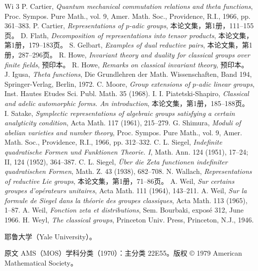 \begin{thebibliography}{Wi 3}
 P. Cartier, \emph{Quantum mechanical commutation relations and theta functions}, Proc. Sympos. Pure Math., vol. 9, Amer. Math. Soc., Providence, R.I., 1966, pp. 361--383.
 P. Cartier, \emph{Representations of $p$-adic groups}, 本论文集，第1册，111--155页。
 D. Flath, \emph{Decomposition of representations into tensor products}, 本论文集，第1册，179--183页。
 S. Gelbart, \emph{Examples of dual reductive pairs}, 本论文集，第1册，287--296页。
 R. Howe, \emph{Invariant theory and duality for classical groups over finite fields}, 预印本。
 R. Howe, \emph{Remarks on classical invariant theory}, 预印本。
 J. Igusa, \emph{Theta functions}, Die Grundlehren der Math. Wissenschaften, Band 194, Springer-Verlag, Berlin, 1972.
 C. Moore, \emph{Group extensions of $p$-adic linear groups}, Inst. Hautes Etudes Sci. Publ. Math. 35 (1968).
 I. I. Piatetski-Shapiro, \emph{Classical and adelic automorphic forms. An introduction}, 本论文集，第1册，185--188页。
 I. Satake, \emph{Symplectic representations of algebraic groups satisfying a certain analyticity condition}, Acta Math. 117 (1961), 215--279.
 G. Shimura, \emph{Moduli of abelian varieties and number theory}, Proc. Sympos. Pure Math., vol. 9, Amer. Math. Soc., Providence, R.I., 1966, pp. 312--332.
 C. L. Siegel, \emph{Indefinite quadratische Formen und Funktionen Theorie. I}, Math. Ann. 124 (1951), 17--24; II, 124 (1952), 364--387.
 C. L. Siegel, \emph{Über die Zeta functionen indefiniter quadratischen Formen}, Math. Z. 43 (1938), 682--708.
 N. Wallach, \emph{Representations of reductive Lie groups}, 本论文集，第1册，71--86页。
 A. Weil, \emph{Sur certains groupes d'opérateurs unitaires}, Acta Math. 111 (1964), 143--211.
 A. Weil, \emph{Sur la formule de Siegel dans la théorie des groupes classiques}, Acta Math. 113 (1965), 1--87.
 A. Weil, \emph{Fonction zeta et distributions}, Sem. Bourbaki, exposé 312, June 1966.
 H. Weyl, \emph{The classical groups}, Princeton Univ. Press, Princeton, N.J., 1946.
\end{thebibliography}
\noindent 耶鲁大学（Yale University）。
\par\noindent\footnotesize 原文 AMS（MOS）学科分类（1970）：主分类 22E55。版权 © 1979 American Mathematical Society。\normalsize
